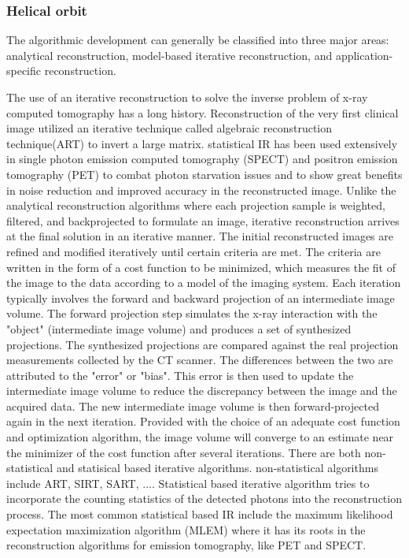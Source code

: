 \subsubsection{Helical orbit}
The algorithmic development can generally be classified into three major areas: analytical reconstruction, model-based iterative reconstruction, and application-specific reconstruction.

The use of an iterative reconstruction to solve the inverse problem of x-ray computed tomography has a long history.  Reconstruction of the very first clinical image utilized an iterative technique called algebraic reconstruction technique(ART) to invert a large matrix.  statistical IR has been used extensively in single photon emission computed tomography (SPECT) and positron emission tomography (PET) to combat photon starvation issues and to show great benefits in noise reduction and improved accuracy in the reconstructed image.  Unlike the analytical reconstruction algorithms where each projection sample is weighted, filtered, and backprojected to formulate an image, iterative reconstruction arrives at the final solution in an iterative manner.  The initial reconstructed images are refined and modified iteratively until certain criteria are met.  The criteria are written in the form of a cost function to be minimized, which measures the fit of the image to the data according to a model of the imaging system.  Each iteration typically involves the forward and backward projection of an intermediate image volume.  The forward projection step simulates the x-ray interaction with the "object" (intermediate image volume) and produces a set of synthesized projections.  The synthesized projections are compared against the real projection measurements collected by the CT scanner.  The differences between the two are attributed to the "error" or "bias".  This error is then used to update the intermediate image volume to reduce the discrepancy between the image and the acquired data.  The new intermediate image volume is then forward-projected again in the next iteration.  Provided with the choice of an adequate cost function and optimization algorithm, the image volume will converge to an estimate near the minimizer of the cost function after several iterations.  
There are both non-statistical and statisical based iterative algorithms.  non-statistical algorithms include ART, SIRT, SART, ....  Statistical based iterative algorithm tries to incorporate the counting statistics of the detected photons into the reconstruction process.  The most common statistical based IR include the maximum likelihood expectation maximization algorithm (MLEM) where it has its roots in the reconstruction algorithms for emission tomography, like PET and SPECT. 
